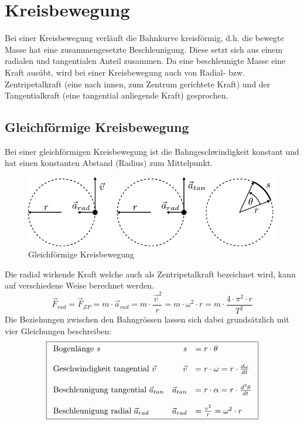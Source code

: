 \chapter{Kreisbewegung}
Bei einer Kreisbewegung verläuft die Bahnkurve kreisförmig,
d.h. die bewegte Masse hat eine zusammengesetzte Beschleunigung.
Diese setzt sich aus einem radialen und tangentialen Anteil 
zusammen. Da eine beschleunigte Masse eine Kraft ausübt, wird 
bei einer Kreisbewegung auch von Radial- bzw. Zentripetalkraft
(eine nach innen, zum Zentrum gerichtete Kraft) und der 
Tangentialkraft (eine tangential anliegende Kraft) gesprochen.

\section{Gleichförmige Kreisbewegung}
Bei einer gleichförmigen Kreisbewegung ist die Bahngeschwindigkeit
konstant und hat einen konstanten Abstand (Radius) zum Mittelpunkt.

\begin{figure}[h!]
	\centering
	\includegraphics[scale=0.8]{kreisbewegung.pdf}
	\caption{Gleichförmige Kreisbewegung}
	\label{fig:kreisbewegung}
\end{figure}

\noindent
Die radial wirkende Kraft welche auch als Zentripetalkraft 
bezeichnet wird, kann auf verschiedene Weise berechnet werden.
\[ \boxed{\vec{F}_{rad} = \vec{F}_{ZP} 
	= m \cdot \vec{a}_{rad}
	= m \cdot \frac{\vec{v}^2}{r} 
	= m \cdot \omega^2 \cdot r 
	= m \cdot \frac{4 \cdot \pi^2 \cdot r}{T^2} } \]
Die Beziehungen zwischen den Bahngrössen lassen sich dabei 
grundsätzlich mit vier Gleichungen beschreiben:
\[ \boxed{ \begin{array}{l r l}
	\text{Bogenlänge $s$} & 
		s & = r \cdot \theta \\
	& & \\
	\text{Geschwindigkeit tangential $\vec{v}$} &
		\vec{v} & = r \cdot \omega
		= r \cdot \frac{d\omega}{dt} \\
	& & \\
	\text{Beschleunigung tangential $\vec{a}_{tan}$} &
		\vec{a}_{tan} & = r \cdot \alpha 
		= r \cdot \frac{d^2\theta}{dt} \\
	& & \\
	\text{Beschleunigung radial $\vec{a}_{rad}$} &
		\vec{a}_{rad} & = \frac{v^2}{r} = \omega^2 \cdot r
\end{array} }\]

